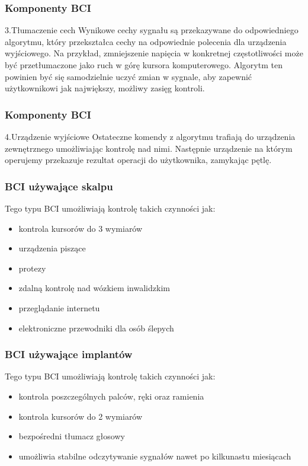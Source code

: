 \documentclass{beamer}
\begin{document}
\begin{frame}
    \frametitle{Komponenty BCI}
    \begin{block}{3.Tłumaczenie cech}
        Wynikowe cechy sygnału są przekazywane do odpowiedniego algorytmu, który przekształca cechy na odpowiednie 
        polecenia dla urządzenia wyjściowego. Na przykład, zmniejszenie napięcia w konkretnej częstotliwości może być
        przetłumaczone jako ruch w górę kursora komputerowego. Algorytm ten powinien być się samodzielnie uczyć zmian w sygnale,
        aby zapewnić użytkownikowi jak największy, możliwy zasięg kontroli.  
    \end{block}
\end{frame}

\begin{frame}
    \frametitle{Komponenty BCI}
    \begin{block}{4.Urządzenie wyjściowe}
        Ostateczne komendy z algorytmu trafiają do urządzenia zewnętrznego umożliwiając kontrolę nad nimi. Następnie 
        urządzenie na którym operujemy przekazuje rezultat operacji do użytkownika, zamykając pętlę.
    \end{block}
\end{frame}

\begin{frame}
    \frametitle{BCI używające skalpu}
    Tego typu BCI umożliwiają kontrolę takich czynności jak:
    \begin{itemize}
        \item kontrola kursorów do 3 wymiarów
        \item urządzenia piszące
        \item protezy
        \item zdalną kontrolę nad wózkiem inwalidzkim
        \item przeglądanie internetu
        \item elektroniczne przewodniki dla osób ślepych
    \end{itemize}
\end{frame}

\begin{frame}
    \frametitle{BCI używające implantów}
    Tego typu BCI umożliwiają kontrolę takich czynności jak:
    \begin{itemize}
        \item kontrola poszczególnych palców, ręki oraz ramienia
        \item kontrola kursorów do 2 wymiarów
        \item bezpośredni tłumacz głosowy
        \item umożliwia stabilne odczytywanie sygnałów nawet po kilkunastu miesiącach
    \end{itemize}
\end{frame}
\end{document}
